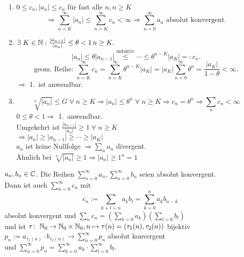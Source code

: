 \documentclass[../ana1.tex]{subfiles}
\begin{document}
\begin{bew}\leavevmode
    \begin{enumerate}
        \item \( 0 \leq c_n, |a_n| \leq c_n \) für fast alle \( n, n\geq K\)
        \[ \Rightarrow \sum_{n=K}^{\infty} |a_n| \leq \sum_{n=K}^\infty c_n < \infty \Rightarrow \sum_{n=0}^\infty a_n \text{ absolut konvergent.} \]
        \item \( \exists \, K\in\N: \frac{|a_{n+1}|}{|a_n|} \leq \theta < 1 \, n\geq K. \)
        \[ |a_n| \leq \theta |a_{n-1}| \overset{\text{induktiv}}{\leq} \cdots \leq \theta^{n-K}|a_K| =: c_n. \]
        \[ \text{geom. Reihe: } \sum_{n=K}^\infty c_n = \sum_{n=K}^\infty \theta^{n-K}|a_K| = |a_K| \sum_{n=0}^\infty \theta^n = \frac{|a_K|}{1-\theta} < \infty. \]
        \( \Rightarrow \) 1.\ ist anwendbar. 
        \item \[ \sqrt[n]{|a_n|} \leq G \;\forall \; n\geq K \Rightarrow |a_n| \leq \theta^n \;\forall \; n\geq K \Rightarrow c_n = \theta^n \Rightarrow \sum_n c_n < \infty \]
        \( 0 \leq \theta < 1 \Rightarrow \) 1.\ anwendbar.\\
        Umgekehrt ist \( \frac{|a_{n+1}|}{|a_n|} \geq 1 \;\forall \; n\geq K \) \\
        \( \Rightarrow |a_n| \geq |a_{n-1}| \geq \cdots \geq |a_K| \) \\
        \( a_n \) ist keine Nullfolge \( \Rightarrow \sum_n a_n \) divergent.\\
        Ähnlich bei \( \sqrt[n]{|a_n|} \geq 1 \Rightarrow |a_n| \geq 1^n = 1 \)
    \end{enumerate}
\end{bew}
\begin{satz}[Cauchyprodukt]
    \( a_n, b_n \in\mathbb{C} \). Die Reihen \( \sum_{n=0}^\infty a_n, \sum_{n=0}^\infty b_n \) seien absolut konvergent.\\
    Dann ist auch \( \sum_{n=0}^\infty c_n \) mit 
    \[ c_n := \sum_{k+l=n} a_k b_l = \sum_{k=0}^n a_k b_{n-k} \]
    absolut konvergent und \( \sum_n c_n = ( \sum_{k=0} a_k )( \sum_{l=0} b_l ) \) \\
    und ist \(\tau \colon \; \mathbb{N}_0 \rightarrow \mathbb{N}_0 \times \mathbb{N}_0, n \mapsto \tau(n) = (\tau_1(n), \tau_2(n)) \) bijektiv
    \( p_n := a_{\tau_1(n)} \cdot b_{\tau_2(n)} \rightarrow \sum_{n=0}^\infty p_n \) absolut konvergent \\
    und \( \sum_{n=0}^\infty p_n = \sum_{k=0}^\infty a_k \cdot \sum_{l=0}^\infty b_l \).
\end{satz}
\end{document}
